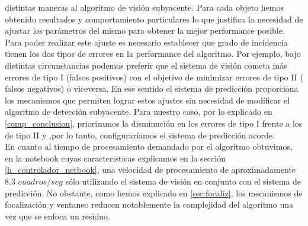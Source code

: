 distintas maneras al algoritmo de visi\'on subyacente. Para cada objeto 
hemos obtenido resultados y comportamiento particulares lo que 
justifica la necesidad de ajustar los par\'ametros del mismo para obtener la mejor 
performance posible. Para poder realizar este ajuste es necesario 
establecer que grado de incidencia tienen los dos tipos de errores en la performance del
algoritmo. Por ejemplo, bajo distintas circunstancias podemos preferir que el  
sistema de visi\'on cometa m\'as errores de tipo I (falsos positivos) con 
el objetivo de minimizar errores de tipo II ( falsos negativos) o 
viceversa. En ese sentido el sistema de predicci\'on proporciona los mecanismos que 
permiten lograr estos ajustes sin necesidad de modificar el algoritmo de detecci\'on 
subyacente. Para nuestro caso, por lo explicado en \ref{comp_conclusion}, priorizamos 
la disminuci\'on en los errores de tipo I frente a los de tipo II y ,por lo tanto, configurar\'iamos
el sistema de predicci\'on acorde.\\
\indent En cuanto al tiempo de procesamiento demandado por el algoritmo obtuvimos, en la notebook
cuyas caracteristicas explicamos en la secci\'on \ref{h_controlador_netbook},
una velocidad de procesamiento de aproximadamente $8.3$ $cuadros/seg$ s\'olo utilizando
el sistema de visi\'on en conjunto con el sistema de predicci\'on. No obstante, como hemos explicado
en \ref{sec:focaliz}, los mecanismos de focalizaci\'on y ventaneo reducen notablemente la
complejidad del algoritmo una vez que se enfoca un residuo.
 

